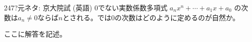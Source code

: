 \begin{prob}{247}{\hosi ?}{元ネタ: 京大院試 (英語)}
 0でない実数係数多項式 $a_nx^n+\cdots +a_1x+a_0$ の次数は$a_n\neq 0$ならば$n$とされる。では0の次数はどのように定めるのが自然か。
\end{prob}
ここに解答を記述。